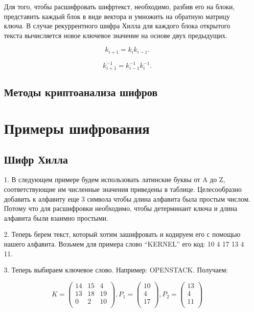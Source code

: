 \documentclass[a4paper]{article}
\begin{document}
Для того, чтобы расшифровать шифртекст, необходимо, разбив его на блоки, представить каждый блок в виде вектора и умножить на обратную матрицу ключа.
В случае рекуррентного шифра Хилла для каждого блока открытого текста вычисляется новое ключевое значение на основе двух предыдущих.

\[
    k_{i+1}=k_i k_{i-1}.
\]

\[
    k^{-1}_{i+1}=k^{-1}_{i-1} k^{-1}_i.
\]

\subsection{Методы криптоанализа шифров}

\section{Примеры шифрования}

\subsection{Шифр Хилла}

1. В следующем примере будем использовать латинские буквы от A до Z, соответствующие им численные значения приведены в таблице. Целесообразно добавить к алфавиту еще 3 символа чтобы длина алфавита была простым числом. Потому что для расшифровки необходимо, чтобы детерминант ключа и длина алфавита были взаимно простыми.

2. Теперь берем текст, который хотим зашифровать и кодируем его с помощью нашего алфавита. Возьмем для примера слово “KERNEL” его код: 10 4 17 13 4 11.

3. Теперь выбираем ключевое слово. Например: OPENSTACK. Получаем:

\[
    K=
    \begin{pmatrix}
        14 & 15 & 4 \\
        13 & 18 & 19 \\
        0 & 2 & 10 \\
    \end{pmatrix},
    P_1=
    \begin{pmatrix}
        10 \\
        4 \\
        17 \\
    \end{pmatrix},
    P_2=
    \begin{pmatrix}
        13 \\
        4 \\
        11 \\
    \end{pmatrix}
\]
\end{document}
